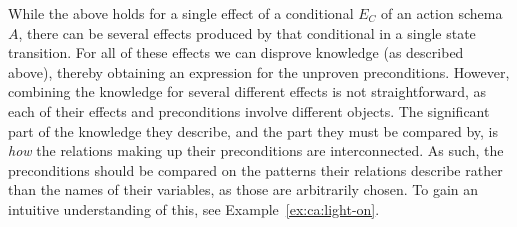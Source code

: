 \documentclass[\master/Master.tex]{subfiles}
\begin{document}
While the above holds for a single effect of a conditional $E_C$ of an action schema $A$, there can be several effects produced by that conditional in a single state transition. For all of these effects we can disprove knowledge (as described above), thereby obtaining an expression for the unproven preconditions. However, combining the knowledge for several different effects is not straightforward, as each of their effects and preconditions involve different objects. The significant part of the knowledge they describe, and the part they must be compared by, is \emph{how} the relations making up their preconditions are interconnected. As such, the preconditions should be compared on the patterns their relations describe rather than the names of their variables, as those are arbitrarily chosen. To gain an intuitive understanding of this, see Example~\ref{ex:ca:light-on}.
\end{document}

